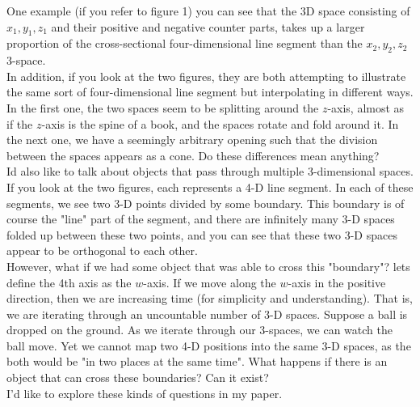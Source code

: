 \documentclass[20pt]{article} %
\begin{document}
One example (if you refer to figure 1) you can see that the 3D space consisting of $x_1, y_1, z_1$ and their positive and negative counter parts, takes up a larger proportion of the cross-sectional four-dimensional line segment than the $x_2, y_2, z_2$ 3-space. \\

In addition, if you look at the two figures, they are both attempting to illustrate the same sort of four-dimensional line segment but interpolating in different ways.  In the first one, the two spaces seem to be splitting around the $z$-axis, almost as if the $z$-axis is the spine of a book, and the spaces rotate and fold around it.  In the next one, we have a seemingly arbitrary opening such that the division between the spaces appears as a cone.  Do these differences mean anything? \\

Id also like to talk about objects that pass through multiple 3-dimensional spaces.  If you look at the two figures, each represents a 4-D line segment.  In each of these segments, we see two 3-D points divided by some boundary.  This boundary is of course the "line" part of the segment, and there are infinitely many 3-D spaces folded up between these two points, and you can see that these two 3-D spaces appear to be orthogonal to each other. \\

However, what if we had some object that was able to cross this "boundary"? lets define the 4th axis as the $w$-axis.  If we move along the $w$-axis in the positive direction, then we are increasing time (for simplicity and understanding).  That is, we are iterating through an uncountable number of 3-D spaces.  Suppose a ball is dropped on the ground. As we iterate through our 3-spaces, we can watch the ball move.  Yet we cannot map two 4-D positions into the same 3-D spaces, as the both would be "in two places at the same time".  What happens if there is an object that can cross these boundaries?  Can it exist? \\

I'd like to explore these kinds of questions in my paper.
\end{document}
